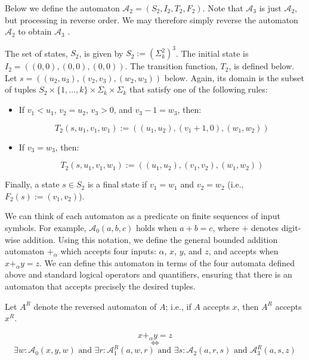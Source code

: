 Below we define the automaton $\mathcal{A}_2 = (S_2, I_2, T_2, F_2)$.
Note that $\mathcal{A}_3$ is just $\mathcal{A}_2$, but processing in reverse order.
We may therefore simply reverse the automaton $\mathcal{A}_2$ to obtain $\mathcal{A}_3$ .

The set of states, $S_2$, is given by $S_2 := (\Sigma_k^2)^3$.
The initial state is $I_2 = ((0,0),(0,0),(0,0))$.
The transition function, $T_2$, is defined below.
Let $s = ((u_2,u_3),(v_2,v_3),(w_2,w_3))$ below.
Again, its domain is the subset of tuples $S_2 \times \{1,\ldots,k\} \times \Sigma_k \times \Sigma_k$ that satisfy one of the following rules:

\begin{itemize}
    \item If $v_1 < u_1$, $v_2 = u_2$, $v_3 > 0$, and $v_3 - 1 = w_3$, then:
    
    $$T_2(s,u_1,v_1,w_1) := ((u_1,u_2),(v_1+1,0),(w_1,w_2))$$
    
    \item If $v_3 = w_3$, then:
    
    $$T_2(s,u_1,v_1,w_1) := ((u_1,u_2),(v_1,v_2),(w_1,w_2))$$
\end{itemize}

Finally, a state $s \in S_2$ is a final state if $v_1 = w_1$ and $v_2 = w_2$ (i.e., $F_2(s) := (v_1,v_2)$).

We can think of each automaton as a predicate on finite sequences of input symbols.
For example, $\mathcal{A}_0(a,b,c)$ holds when $a + b = c$, where $+$ denotes digit-wise addition.
Using this notation, we define the general bounded addition automaton $+_{\alpha}$ which accepts four inputs: $\alpha$, $x$, $y$, and $z$, and accepts when $x +_{\alpha} y = z$.
We can define this automaton in terms of the four automata defined above and standard logical operators and quantifiers, ensuring that there is an automaton that accepts precisely the desired tuples.

Let $A^R$ denote the reversed automaton of $A$; i.e., if $A$ accepts $x$, then $A^R$ accepts $x^R$.

\begin{equation*}
    x +_{\alpha} y = z
\end{equation*}
\begin{equation*}
    \iff
\end{equation*}
\begin{equation*}
    \exists w : \mathcal{A}_0(x,y,w) \text{ and } \exists r : \mathcal{A}_1^R(a,w,r) \text{ and } \exists s : \mathcal{A}_2(a,r,s) \text{ and } \mathcal{A}_3^R(a,s,z)
\end{equation*}

